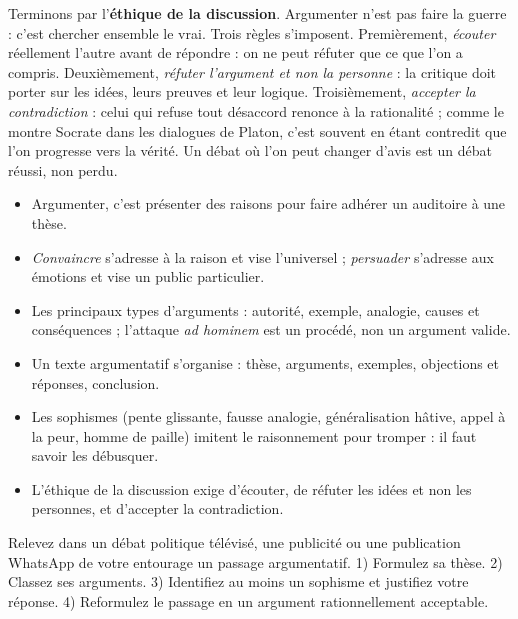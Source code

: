 \documentclass[11pt]{article}
\begin{document}
Terminons par l'\textbf{éthique de la discussion}. Argumenter n'est pas faire la guerre : c'est chercher ensemble le vrai. Trois règles s'imposent. Premièrement, \emph{écouter} réellement l'autre avant de répondre : on ne peut réfuter que ce que l'on a compris. Deuxièmement, \emph{réfuter l'argument et non la personne} : la critique doit porter sur les idées, leurs preuves et leur logique. Troisièmement, \emph{accepter la contradiction} : celui qui refuse tout désaccord renonce à la rationalité ; comme le montre Socrate dans les dialogues de Platon, c'est souvent en étant contredit que l'on progresse vers la vérité. Un débat où l'on peut changer d'avis est un débat réussi, non perdu.

\begin{aretenir}[L'essentiel]
\begin{itemize}
\item Argumenter, c'est présenter des raisons pour faire adhérer un auditoire à une thèse.
\item \emph{Convaincre} s'adresse à la raison et vise l'universel ; \emph{persuader} s'adresse aux émotions et vise un public particulier.
\item Les principaux types d'arguments : autorité, exemple, analogie, causes et conséquences ; l'attaque \emph{ad hominem} est un procédé, non un argument valide.
\item Un texte argumentatif s'organise : thèse, arguments, exemples, objections et réponses, conclusion.
\item Les sophismes (pente glissante, fausse analogie, généralisation hâtive, appel à la peur, homme de paille) imitent le raisonnement pour tromper : il faut savoir les débusquer.
\item L'éthique de la discussion exige d'écouter, de réfuter les idées et non les personnes, et d'accepter la contradiction.
\end{itemize}
\end{aretenir}

\begin{exercice}
Relevez dans un débat politique télévisé, une publicité ou une publication WhatsApp de votre entourage un passage argumentatif. 1) Formulez sa thèse. 2) Classez ses arguments. 3) Identifiez au moins un sophisme et justifiez votre réponse. 4) Reformulez le passage en un argument rationnellement acceptable.
\end{exercice}
\end{document}
